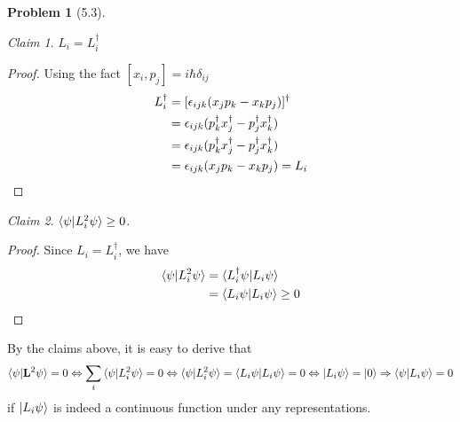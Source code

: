 \documentclass[twoside,11pt]{article}
\theoremstyle{definition}
\newtheorem{problem}{Problem}
\theoremstyle{remark}
\newtheorem*{claim}{Claim}
\begin{document}
\begin{problem}[5.3]
\begin{claim}
    $L_i = L_i^\dagger$
\end{claim}
\begin{proof}
    Using the fact $[x_i,p_j]=i\hbar\delta_{ij}$
    \begin{align*}
        L_i^\dag &= [\epsilon_{ijk}(x_jp_k - x_kp_j)]^\dag\\
        &= \epsilon_{ijk}(p_k^\dag x_j^\dag - p_j^\dag x_k^\dag)\\
        &= \epsilon_{ijk}(p_k^\dag x_j^\dag - p_j^\dag x_k^\dag)\\
        &= \epsilon_{ijk}(x_jp_k - x_kp_j) = L_i\qedhere
    \end{align*}
\end{proof}
\begin{claim}
    $\braket{\psi|L_i^2\psi}\geq 0$.
\end{claim}
\begin{proof}
    Since $L_i=L_i^\dagger$, we have
    \begin{align*}
        \braket{\psi|L_i^2\psi} &= \braket{L_i^\dagger\psi|L_i\psi}\\
        &= \braket{L_i\psi|L_i\psi} \geq 0\qedhere
    \end{align*}
\end{proof}

By the claims above, it is easy to derive that
\begin{align*}
    \braket{\psi|\mathbf{L}^2\psi} = 0\Leftrightarrow
    \sum_{i}\braket{\psi|L_i^2\psi} = 0\Leftrightarrow
    \braket{\psi|L_i^2\psi} = \braket{L_i\psi|L_i\psi} = 0
    \Leftrightarrow \ket{L_i\psi} = \ket{0}\Rightarrow
    \braket{\psi|L_i\psi} = 0
\end{align*}
if $\ket{L_i\psi}$ is indeed a continuous function under any
representations.


\end{problem}


\end{document}
